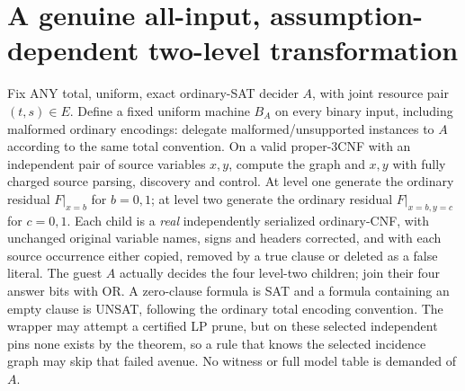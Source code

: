 \documentclass[11pt]{article}
\begin{document}
\section{A genuine all-input, assumption-dependent two-level transformation}
Fix ANY total, uniform, exact ordinary-SAT decider \(A\), with joint
resource pair \((t,s)\in E\). Define a fixed uniform machine
\(B_A\) on every binary input, including malformed ordinary encodings:
delegate malformed/unsupported instances to \(A\) according to the
same total convention. On a valid proper-3CNF with an independent pair
of source variables \(x,y\), compute the graph and \(x,y\)
with fully charged source parsing, discovery and control.
At level one generate the ordinary residual \(F|_{x=b}\) for \(b=0,1\);
at level two generate the ordinary residual
\(F|_{x=b,y=c}\) for \(c=0,1\).
Each child is a \emph{real} independently serialized ordinary-CNF,
with unchanged original variable names, signs and headers corrected,
and with each source occurrence either copied, removed by a true
clause or deleted as a false literal. The guest \(A\) actually
decides the four level-two children; join their four answer bits
with OR. A zero-clause formula is SAT and a formula containing an
empty clause is UNSAT, following the ordinary total encoding convention.
The wrapper may attempt a certified LP prune, but on these selected
independent pins none exists by the theorem, so a rule that knows
the selected incidence graph may skip that failed avenue.
No witness or full model table is demanded of \(A\).
\end{document}
